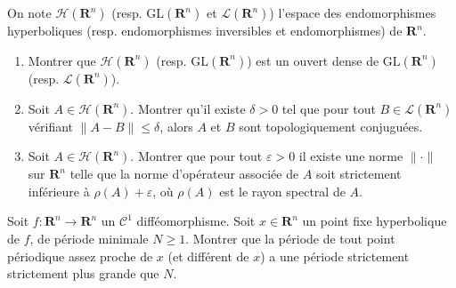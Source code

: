 \documentclass[a4paper,10pt,openany]{article}
\theoremstyle{plain}
\theoremstyle{definition}
\newcommand{\R}{\mathbf{R}}
\begin{document}
 \vspace{1.5mm} 

\noindent On note $\mathcal{H}(\R^n)$ (resp. $\mathrm{GL}(\R^n)$ et $\mathcal{L}(\R^n)$) l'espace des endomorphismes hyperboliques (resp. endomorphismes inversibles et endomorphismes) de $\R^n$. 

\begin{enumerate}

\item Montrer que $\mathcal{H}(\R^n)$ (resp. $\mathrm{GL}(\R^n)$) est un ouvert dense de $\mathrm{GL}(\R^n)$ (resp. $\mathcal{L}(\R^n)$).


\item Soit $A \in \mathcal{H}(\R^n)$. Montrer qu'il existe $\delta > 0$ tel que pour tout $B \in \mathcal{L}(\R^n)$ v\'erifiant $\|A-B\| \leq \delta$, alors $A$ et $B$ sont topologiquement conjugu\'ees.


\item Soit $A \in \mathcal{H}(\R^n)$. Montrer que pour tout $\varepsilon>0$ il existe une norme $\|\cdot\|$ sur $\R^n$ telle que la norme d'op\'erateur associ\'ee de $A$ soit strictement inf\'erieure \`a $\rho(A) + \varepsilon$, o\`u $\rho(A)$ est le rayon spectral de $A$.

\end{enumerate}

\vspace{0.6cm}

 \vspace{1.5mm} 

\noindent Soit $f : \R^n \to \R^n$ un $\mathcal{C}^1$ diff\'eomorphisme. Soit $x \in \R^n$ un point fixe hyperbolique de $f$, de p\'eriode minimale $N \geqslant 1$. Montrer que la p\'eriode de tout point p\'eriodique assez proche de $x$ (et diff\'erent de $x$) a une p\'eriode strictement strictement plus grande que $N$.
\vspace{0.6cm}

 \vspace{1.5mm} 
\end{document}
